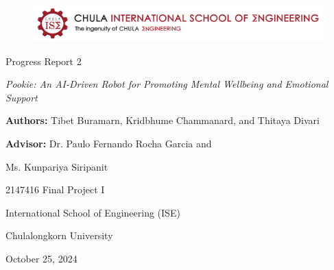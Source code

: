\documentclass[a4paper,10pt]{article}
\begin{document}
\begin{titlepage}
    \centering  
    \begin{figure}[ht]
        \centering
        \includegraphics[width=\textwidth]{ise-logo.png}
    \end{figure}
    \vspace*{2cm} 
    
    {\Huge Progress Report 2\par}
    \vspace{1cm}
    
    {\Huge \textit{Pookie: An AI-Driven Robot for Promoting Mental Wellbeing and Emotional Support} \par}
    \vspace{3cm}
    
    {\large \textbf{Authors:} Tibet Buramarn, Kridbhume Chammanard, and Thitaya Divari \par}
    \vspace{1cm}
    {\large \textbf{Advisor:} Dr. Paulo Fernando Rocha Garcia and \par}
    {\large Ms. Kunpariya Siripanit \par}

    \vspace{3cm}
    
    {\large 2147416 Final Project I \par}
    {\large International School of Engineering (ISE) \par}
    {\large Chulalongkorn University \par}
    
    \vspace{2cm}
    
    {\large October 25, 2024 \par}
    
    \vspace*{\fill}
\end{titlepage}

\thispagestyle{empty}

\newpage
\tableofcontents

\newpage


\newpage

\newpage


\end{document}
